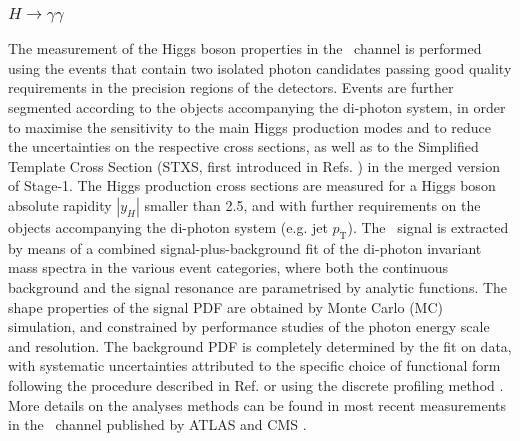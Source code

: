 \subsubsection{$H \to \gamma\gamma$}
\label{sec:Hgammagamma}

The measurement of the Higgs boson properties in the \Hyy\ channel is performed using the events that contain two isolated photon candidates passing good quality requirements in the precision regions of the detectors. Events are further segmented according to the objects accompanying the di-photon system, in order to maximise the sensitivity to the main Higgs production modes and to reduce the uncertainties on the respective cross sections, as well as to the Simplified Template Cross Section (STXS, first introduced in Refs. \cite{deFlorian:2016spz,Badger:2016bpw}) in the merged version of Stage-1.
The Higgs production cross sections are measured for a Higgs boson absolute rapidity $|y_H|$ smaller than 2.5, and with further requirements on the objects accompanying the di-photon system (e.g. jet $p_\mathrm{T}$).
The \Hyy\ signal is extracted by means of a combined signal-plus-background fit of the di-photon invariant mass spectra in the various event categories, where both the continuous background and the signal resonance are parametrised by analytic functions. The shape properties of the signal PDF are obtained by Monte Carlo (MC) simulation, and constrained by performance studies of the photon energy scale and resolution. The background PDF is completely determined by the fit on data, with systematic uncertainties attributed to the specific choice of functional form following the procedure described in Ref. \cite{Aad:2012tfa} or using the discrete profiling method \cite{Dauncey:2014xga}. More details on the analyses methods can be found in most recent measurements in the \Hyy\ channel published by ATLAS \cite{ATLAS:2018uso} and CMS \cite{Sirunyan:2018ouh}. 

